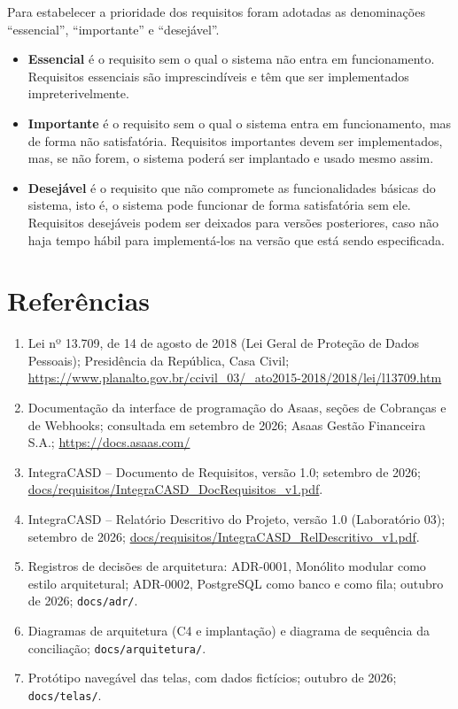 \documentclass[11pt,a4paper,oneside]{report}
\begin{document}
Para estabelecer a prioridade dos requisitos foram adotadas as denominações ``essencial'',
``importante'' e ``desejável''.
\begin{itemize}
  \item \textbf{Essencial} é o requisito sem o qual o sistema não entra em funcionamento.
        Requisitos essenciais são imprescindíveis e têm que ser implementados impreterivelmente.
  \item \textbf{Importante} é o requisito sem o qual o sistema entra em funcionamento, mas de forma
        não satisfatória. Requisitos importantes devem ser implementados, mas, se não forem, o
        sistema poderá ser implantado e usado mesmo assim.
  \item \textbf{Desejável} é o requisito que não compromete as funcionalidades básicas do sistema,
        isto é, o sistema pode funcionar de forma satisfatória sem ele. Requisitos desejáveis
        podem ser deixados para versões posteriores, caso não haja tempo hábil para implementá-los
        na versão que está sendo especificada.
\end{itemize}

\section*{Referências}

\begin{enumerate}[before=\raggedright]
  \item Lei nº 13.709, de 14 de agosto de 2018 (Lei Geral de Proteção de Dados Pessoais);
        Presidência da República, Casa Civil;
        \url{https://www.planalto.gov.br/ccivil_03/_ato2015-2018/2018/lei/l13709.htm}
  \item Documentação da interface de programação do Asaas, seções de Cobranças e de Webhooks;
        consultada em setembro de 2026; Asaas Gestão Financeira S.A.;
        \url{https://docs.asaas.com/}
  \item IntegraCASD -- Documento de Requisitos, versão 1.0; setembro de 2026;
        \url{docs/requisitos/IntegraCASD_DocRequisitos_v1.pdf}.
  \item IntegraCASD -- Relatório Descritivo do Projeto, versão 1.0 (Laboratório 03); setembro de
        2026; \url{docs/requisitos/IntegraCASD_RelDescritivo_v1.pdf}.
  \item Registros de decisões de arquitetura: ADR-0001, Monólito modular como estilo arquitetural;
        ADR-0002, PostgreSQL como banco e como fila; outubro de 2026; \texttt{docs/adr/}.
  \item Diagramas de arquitetura (C4 e implantação) e diagrama de sequência da conciliação;
        \texttt{docs/arquitetura/}.
  \item Protótipo navegável das telas, com dados fictícios; outubro de 2026;
        \texttt{docs/telas/}.
\end{enumerate}
\end{document}
